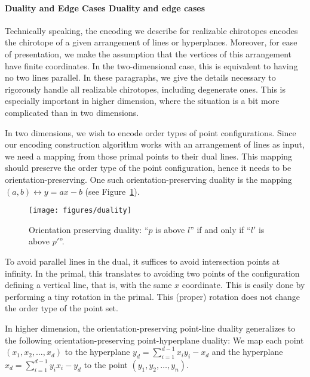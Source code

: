 
\paragraph*{\iftitlecase%
Duality and Edge Cases\else%
Duality and edge cases\fi}\label{prg:duality}

Technically speaking, the encoding we describe for realizable chirotopes
encodes the chirotope of a given arrangement of lines or hyperplanes.
Moreover, for ease of presentation, we make the assumption that the vertices of
this arrangement have finite coordinates. In the two-dimensional case, this
is equivalent to having no two lines parallel. In these paragraphs, we give the
details necessary to rigorously handle all realizable chirotopes, including
degenerate ones. This is especially important in higher dimension, where the
situation is a bit more complicated than in two dimensions.

In two dimensions, we wish to encode order types of point configurations.
Since our encoding construction algorithm works with an arrangement of lines as
input, we need a mapping from those primal points to their dual lines. This
mapping should preserve the order type of the point configuration, hence it
needs to be orientation-preserving. One such orientation-preserving duality is
the mapping \((a,b) \leftrightarrow y = ax - b\) (see Figure~\ref{fig:duality}).

\begin{figure}
  \centering{}
  \texttt{[image: figures/duality]}
  \caption{Orientation preserving duality: ``\(p\) is above \(l\)'' if and only if
  ``\(l'\) is above \(p'\)''.}\label{fig:duality}
\end{figure}

To avoid parallel lines in the dual, it suffices to avoid intersection points
at infinity. In the primal, this translates to avoiding two points of the
configuration defining a vertical line, that is, with the same \(x\) coordinate.
This is easily done by performing a tiny rotation in the primal.
This (proper) rotation does not change the order type of the point set.

In higher dimension, the orientation-preserving point-line duality generalizes
to the following orientation-preserving point-hyperplane duality: We map each
point \((x_1, x_2, \ldots, x_d)\) to the hyperplane \(y_d = \sum_{i=1}^{d-1}
x_i y_i - x_d \) and the hyperplane \(x_d = \sum_{i=1}^{d-1} y_i x_i - y_d \)
to the point \(( y_1, y_2, \ldots, y_n)\).


